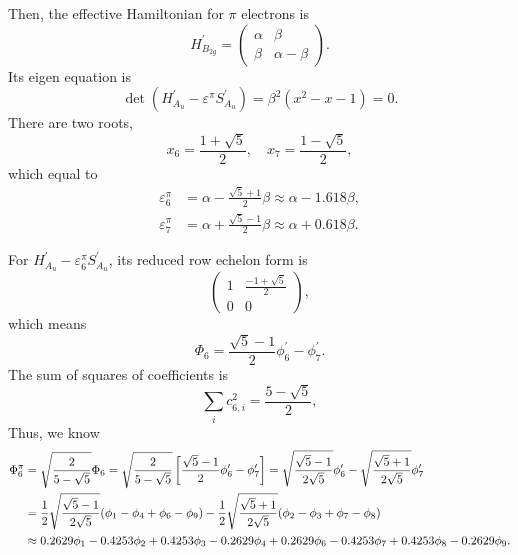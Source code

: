 \documentclass[a4paper]{book}
\newcommand{\Hp}{H^\prime}
\newcommand{\Sp}{S^\prime}
\begin{document}
\begin{solution}
\begin{enumerate}[label=(\alph*)]
		Then, the effective Hamiltonian for $\pi$ electrons is
		\begin{equation*}
			H^\prime_{B_{2g}} = \begin{pmatrix}
				\alpha	&	\beta	\\
				\beta	&	\alpha-\beta
				\end{pmatrix}.				
		\end{equation*}
		Its eigen equation is		
		\begin{equation}
			\det(\Hp_{A_u}-\varepsilon^\pi \Sp_{A_u}) = \beta^2 ( x^2 - x - 1 ) = 0.
		\end{equation}
		There are two roots,
		\begin{equation}
			x_6 = \frac{1+\sqrt{5}}{2}, \quad x_7 = \frac{1-\sqrt{5}}{2},
		\end{equation}
		which equal to
		\begin{align}
			\varepsilon^\pi_6 &= \alpha - \frac{\sqrt{5}+1}{2}\beta \approx \alpha - 1.618 \beta, \\
			\varepsilon^\pi_7 &= \alpha + \frac{\sqrt{5}-1}{2}\beta \approx \alpha + 0.618 \beta.
		\end{align}
		
		For $\Hp_{A_u}-\varepsilon^\pi_6 \Sp_{A_u}$, its reduced row echelon form is
		\begin{equation*}
			\begin{pmatrix}
				1	& \frac{-1+\sqrt{5}}{2}	\\	0	&	0
			\end{pmatrix},
		\end{equation*}
		which means
		\begin{equation*}
			\Phi_6 = \frac{\sqrt{5}-1}{2}\phi^\prime_6 - \phi^\prime_7.
		\end{equation*}
		The sum of squares of coefficients is
		\begin{equation*}
			\sum_{i} c^2_{6,i} = \frac{ 5-\sqrt{5} }{2},
		\end{equation*}
		Thus, we know
		\begin{align}
			\Phi^\pi_6 &= \sqrt{ \frac{2}{5-\sqrt{5}} } \Phi_6 = \sqrt{ \frac{2}{5-\sqrt{5}} } \left[ \frac{\sqrt{5}-1}{2}\phi^\prime_6 - \phi^\prime_7 \right] = \sqrt{\frac{\sqrt{5}-1}{2\sqrt{5}}} \phi^\prime_6 - \sqrt{\frac{\sqrt{5}+1}{2\sqrt{5}}} \phi^\prime_7	\notag \\
			&= \frac{1}{2}\sqrt{\frac{\sqrt{5}-1}{2\sqrt{5}}} (\phi_1 - \phi_4 + \phi_6 - \phi_9) - \frac 12 \sqrt{\frac{\sqrt{5}+1}{2\sqrt{5}}} (\phi_2 - \phi_3 + \phi_7 - \phi_8)\notag \\
			&\approx 0.2629 \phi_1 - 0.4253 \phi_2 + 0.4253 \phi_3 -0.2629 \phi_4 + 0.2629 \phi_6 - 0.4253 \phi_7 + 0.4253\phi_8 - 0.2629 \phi_9.
		\end{align}
		

\end{enumerate}
\end{solution}
\end{document}
